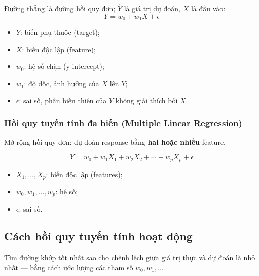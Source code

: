 
\begin{phuongphap}[title={Phương trình}]
Đường thẳng là đường hồi quy đơn; $\hat{Y}$ là giá trị dự đoán, $X$ là đầu vào:
\[
Y = w_0 + w_1 X + \epsilon
\]
\begin{itemize}
  \item $Y$: biến phụ thuộc (target);
  \item $X$: biến độc lập (feature);
  \item $w_0$: hệ số chặn (y-intercept);
  \item $w_1$: độ dốc, ảnh hưởng của $X$ lên $Y$;
  \item $\epsilon$: sai số, phần biến thiên của $Y$ không giải thích bởi $X$.
\end{itemize}
\end{phuongphap}

\subsubsection{Hồi quy tuyến tính đa biến (Multiple Linear Regression)}

\begin{dinhnghia}[title={Hồi quy tuyến tính đa biến}]
Mở rộng hồi quy đơn: dự đoán response bằng \textbf{hai hoặc nhiều} feature.
\end{dinhnghia}

\begin{phuongphap}[title={Phương trình đa biến}]
\[
Y = w_0 + w_1 X_1 + w_2 X_2 + \cdots + w_p X_p + \epsilon
\]
\begin{itemize}
  \item $X_1,\ldots,X_p$: biến độc lập (features);
  \item $w_0,w_1,\ldots,w_p$: hệ số;
  \item $\epsilon$: sai số.
\end{itemize}
\end{phuongphap}

\subsection{Cách hồi quy tuyến tính hoạt động}

\begin{dongco}[title={target}]
Tìm đường khớp tốt nhất sao cho chênh lệch giữa giá trị thực và dự đoán là nhỏ nhất --- bằng cách ước lượng các tham số $w_0, w_1, \ldots$
\end{dongco}

